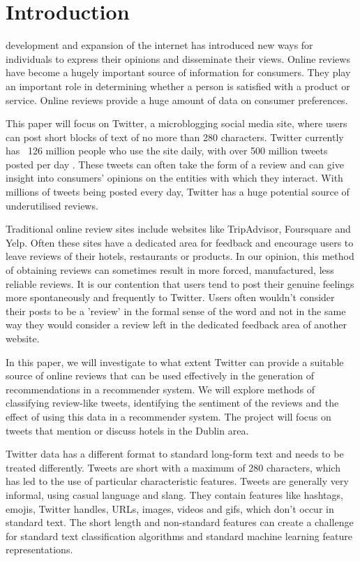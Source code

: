 \section{Introduction}
 development and expansion of the internet has introduced new ways for individuals to express their opinions and disseminate their views. Online reviews have become a hugely important source of information for consumers. They play an important role in determining whether a person is satisfied with a product or service. Online reviews provide a huge amount of data on consumer preferences. 

This paper will focus on Twitter, a microblogging social media site, where users can post short blocks of text of no more than 280 characters. Twitter currently has ~126 million people who use the site daily, with over 500 million tweets posted per day \cite{Twitter2019}. These tweets can often take the form of a review and can give insight into consumers' opinions on the entities with which they interact. With millions of tweets being posted every day, Twitter has a huge potential source of underutilised reviews.

Traditional online review sites include websites like TripAdvisor, Foursquare and Yelp. Often these sites have a dedicated area for feedback and encourage users to leave reviews of their hotels, restaurants or products. In our opinion, this method of obtaining reviews can sometimes result in more forced, manufactured, less reliable reviews. It is our contention that users tend to post their genuine feelings more spontaneously and frequently to Twitter. Users often wouldn't consider their posts to be a 'review' in the formal sense of the word and not in the same way they would consider a review left in the dedicated feedback area of another website.

In this paper, we will investigate to what extent Twitter can provide a suitable source of online reviews that can be used effectively in the generation of recommendations in a recommender system. We will explore methods of classifying review-like tweets, identifying the sentiment of the reviews and the effect of using this data in a recommender system. The project will focus on tweets that mention or discuss hotels in the Dublin area.

Twitter data has a different format to standard long-form text and needs to be treated differently. Tweets are short with a maximum of 280 characters, which has led to the use of particular characteristic features. Tweets are generally very informal, using casual language and slang. They contain features like hashtags, emojis, Twitter handles, URLs, images, videos and gifs, which don't occur in standard text. The short length and non-standard features can create a challenge for standard text classification algorithms and standard machine learning feature representations. 

